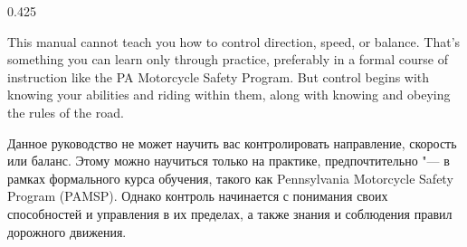 
\begin{langblock}{0.425}
	\begin{eng}
	This manual cannot teach you how to control direction, speed, or balance. That's something you can learn only through practice, preferably in a formal course of instruction like the PA Motorcycle Safety Program. But control begins with knowing your abilities and riding within them, along with knowing and obeying the rules of the road.
	\end{eng}
	\begin{rus}
		Данное руководство не может научить вас контролировать направление, скорость или баланс. Этому можно научиться только на практике, предпочтительно "--- в рамках формального курса обучения, такого как Pennsylvania Motorcycle Safety Program (PAMSP). Однако контроль начинается с понимания своих способностей и управления в их пределах, а также знания и соблюдения правил дорожного движения.
\end{rus}
\end{langblock}

